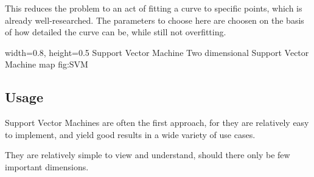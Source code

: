 This reduces the problem to an act of fitting a curve to specific points, which is already well-researched. The parameters to choose here are choosen on the basis of how detailed the curve can be, while still not overfitting.

    {width=0.8\textwidth, height=0.5\textheight} %
    {Support Vector Machine}   %
    {Two dimensional Support Vector Machine map}   %
    {fig:SVM}    %

\subsection{Usage}
Support Vector Machines are often the first approach, for they are relatively easy to implement, and yield good results in a wide variety of use cases. 

They are relatively simple to view and understand, should there only be few important dimensions.

